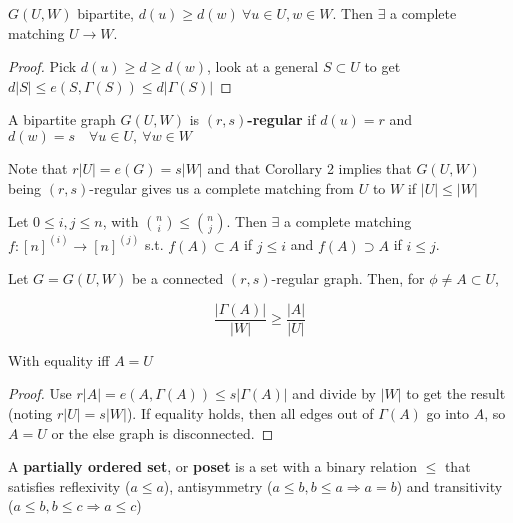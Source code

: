 \documentclass[a4paper]{article}
\begin{document}
{\begin{cor-num}
	$G(U,W)$ bipartite, $d(u)\geq d(w)\ \forall u\in U, w\in W$. Then $\exists$ a complete matching $U\rightarrow W$.
\end{cor-num}
\begin{proof}
	Pick $d(u)\geq d\geq d(w)$, look at a general $S\subset U$ to get $d|S| \leq e(S, \Gamma(S)) \leq d|\Gamma(S)|$
\end{proof}


\begin{defi}[$(r,s)$-regular]
	A bipartite graph $G(U, W)$ is \textbf{$(r,s)$-regular} if $d(u)=r$ and $d(w)=s\quad\forall u\in U,\ \forall w\in W$
\end{defi}

Note that $r|U|=e(G)=s|W|$ and that Corollary 2 implies that $G(U, W)$ being $(r,s)$-regular gives us a complete matching from $U$ to $W$ if $|U|\leq |W|$

\begin{cor-num}
	Let $0\leq i,j\leq n$, with $\binom{n}{i}\leq\binom{n}{j}$. Then $\exists$ a complete matching $f:[n]^{(i)}\rightarrow[n]^{(j)}$ s.t. $f(A)\subset A$ if $j\leq i$ and $f(A)\supset A$ if $i\leq j$.
\end{cor-num}

\begin{thm-num}
	Let $G=G(U,W)$ be a connected $(r,s)$-regular graph. Then, for $\phi\neq A\subset U$,
	
	$$\frac{|\Gamma(A)|}{|W|}\geq \frac{|A|}{|U|}$$
	
	With equality iff $A=U$
\end{thm-num}
\begin{proof}
	Use $r|A|=e(A,\Gamma(A))\leq s|\Gamma(A)|$ and divide by $|W|$ to get the result (noting $r|U|=s|W|$). If equality holds, then all edges out of $\Gamma(A)$ go into $A$, so $A=U$ or the else graph is disconnected.
\end{proof}

\begin{defi}
	A \textbf{partially ordered set}, or \textbf{poset} is a set with a binary relation $\leq$ that satisfies reflexivity ($a\leq a$), antisymmetry ($a\leq b, b\leq a \Rightarrow a=b$) and transitivity ($a\leq b, b\leq c \Rightarrow a\leq c$)
\end{defi}

}
\end{document}
